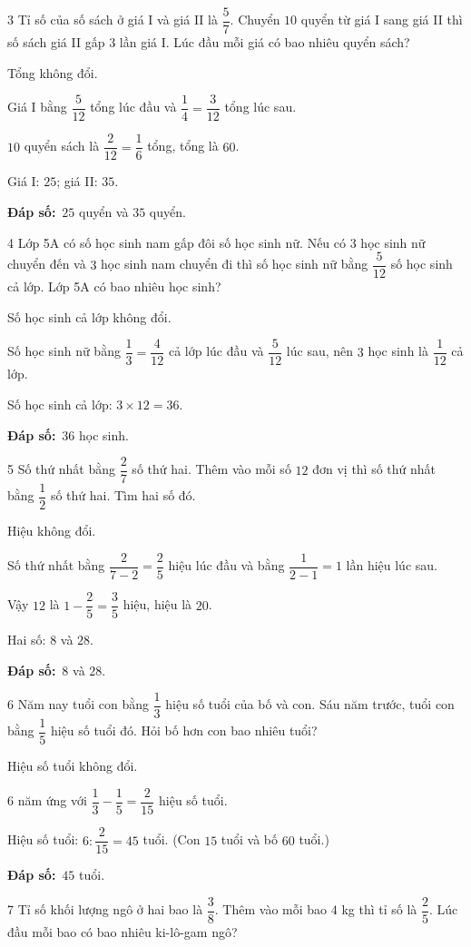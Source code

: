 \documentclass[11pt]{article}
\newif\ifsol \solfalse
\providecommand{\AnsWord}{Đáp số}
\newcommand{\dapso}[1]{\par\textbf{\AnsWord:}\ #1}
\newcommand{\probsol}[1]{%
  \begin{lrbox}{\solmeasure}\begin{minipage}{\dimexpr\linewidth-24pt\relax}#1\end{minipage}\end{lrbox}%
  \ifsol
    \begin{solbox}#1\end{solbox}%
  \else
    \setlength{\solht}{\dimexpr\ht\solmeasure+\dp\solmeasure+0.85cm\relax}%
    \ifdim\solht<1.35cm\setlength{\solht}{1.35cm}\fi
    \begin{tcolorbox}[colback=white,colframe=Line,boxrule=0.8pt,arc=5pt,
      left=8pt,right=8pt,top=4pt,bottom=4pt,height=\solht]{\footnotesize\color{Slate}\itshape\WorkWord}\end{tcolorbox}%
  \fi}
\newcommand{\gap}{\vspace{0.3cm}}
\def\WorkWord{Bài làm:}
\def\AnsWord{Đáp số}
\begin{document}
\gap
\begin{probbox}{3}{\relax}
Tỉ số của số sách ở giá I và giá II là $\dfrac57$. Chuyển $10$ quyển từ giá I sang giá II thì số sách giá II gấp $3$ lần giá I. Lúc đầu mỗi giá có bao nhiêu quyển sách?
\end{probbox}
\probsol{
Tổng không đổi.\par Giá I bằng $\dfrac5{12}$ tổng lúc đầu và $\dfrac14=\dfrac3{12}$ tổng lúc sau.\par $10$ quyển sách là $\dfrac2{12}=\dfrac16$ tổng, tổng là $60$.\par
Giá I: $25$; giá II: $35$.
\dapso{$25$ quyển và $35$ quyển.}}
\gap
\begin{probbox}{4}{\relax}
Lớp 5A có số học sinh nam gấp đôi số học sinh nữ. Nếu có $3$ học sinh nữ chuyển đến và $3$ học sinh nam chuyển đi thì số học sinh nữ bằng $\dfrac5{12}$ số học sinh cả lớp. Lớp 5A có bao nhiêu học sinh?
\end{probbox}
\probsol{
Số học sinh cả lớp không đổi.\par Số học sinh nữ bằng $\dfrac13=\dfrac4{12}$ cả lớp lúc đầu và $\dfrac5{12}$ lúc sau, nên $3$ học sinh là $\dfrac1{12}$ cả lớp.\par
Số học sinh cả lớp: $3\times12=36$.
\dapso{$36$ học sinh.}}
\gap
\begin{probbox}{5}{\relax}
Số thứ nhất bằng $\dfrac27$ số thứ hai. Thêm vào mỗi số $12$ đơn vị thì số thứ nhất bằng $\dfrac12$ số thứ hai. Tìm hai số đó.
\end{probbox}
\probsol{
Hiệu không đổi.\par Số thứ nhất bằng $\dfrac2{7-2}=\dfrac25$ hiệu lúc đầu và bằng $\dfrac1{2-1}=1$ lần hiệu lúc sau.\par
Vậy $12$ là $1-\dfrac25=\dfrac35$ hiệu, hiệu là $20$.\par Hai số: $8$ và $28$.
\dapso{$8$ và $28$.}}
\gap
\begin{probbox}{6}{\relax}
Năm nay tuổi con bằng $\dfrac13$ hiệu số tuổi của bố và con. Sáu năm trước, tuổi con bằng $\dfrac15$ hiệu số tuổi đó. Hỏi bố hơn con bao nhiêu tuổi?
\end{probbox}
\probsol{
Hiệu số tuổi không đổi.\par $6$ năm ứng với $\dfrac13-\dfrac15=\dfrac2{15}$ hiệu số tuổi.\par
Hiệu số tuổi: $6:\dfrac2{15}=45$ tuổi. (Con $15$ tuổi và bố $60$ tuổi.)
\dapso{$45$ tuổi.}}
\gap
\begin{probbox}{7}{\relax}
Tỉ số khối lượng ngô ở hai bao là $\dfrac38$. Thêm vào mỗi bao $4$ kg thì tỉ số là $\dfrac25$. Lúc đầu mỗi bao có bao nhiêu ki-lô-gam ngô?
\end{probbox}
\end{document}
